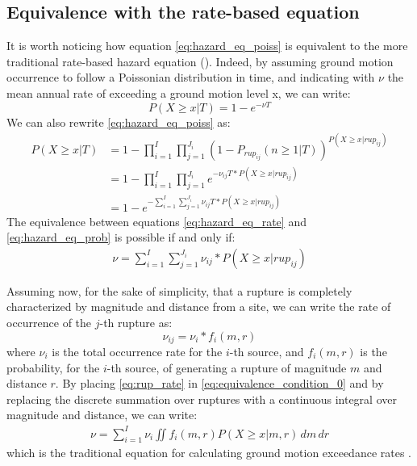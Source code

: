 \subsection{Equivalence with the rate-based equation}
It is worth noticing how equation \ref{eq:hazard_eq_poiss} is equivalent to the more traditional rate-based
hazard equation (\cite{mcguire1995}). Indeed, by assuming ground motion occurrence to follow a Poissonian
distribution in time, and indicating with $\nu$ the mean annual rate of exceeding a ground motion level x,
we can write:
\begin{equation}
\label{eq:hazard_eq_rate}
P(X \ge x | T) = 1 - e ^ {- \nu T}
\end{equation}
We can also rewrite \ref{eq:hazard_eq_poiss} as:
\begin{align}
\label{eq:hazard_eq_prob}
P(X \ge x | T) &= 1 - \prod_{i=1}^{I} \prod_{j=1}^{J_{i}} (1 - P_{rup_{ij}}(n \ge 1 | T))^{P(X \ge x | rup_{ij})} \nonumber \\
		      &= 1 - \prod_{i=1}^{I} \prod_{j=1}^{J_{i}} e^{-\nu_{ij} T * P(X \ge x | rup_{ij})} \nonumber \\
		      & = 1 - e ^ {- \sum_{i=1}^{I} \sum_{j=1}^{J_{i}} \nu_{ij} T * P(X \ge x | rup_{ij})}
\end{align}
The equivalence between equations \ref{eq:hazard_eq_rate} and \ref{eq:hazard_eq_prob} is possible if and only if:
\begin{align}
\label{eq:equivalence_condition_0}
\nu  =  \sum_{i=1}^{I} \sum_{j=1}^{J_{i}} \nu_{ij} * P(X \ge x | rup_{ij})
\end{align}

Assuming now, for the sake of simplicity, that a rupture is completely characterized by magnitude and distance from a site, we
can write the rate of occurrence of the $j$-th rupture as:
\begin{equation}
\label{eq:rup_rate}
\nu_{ij} = \nu_{i} * f_{i}(m, r)
\end{equation}
where $\nu_{i}$ is the total occurrence rate for the $i$-th source, and
$f_{i}(m, r)$ is the probability, for the $i$-th source, of generating a rupture
of magnitude $m$ and distance $r$. By placing \ref{eq:rup_rate} in
\ref{eq:equivalence_condition_0} and by replacing the discrete summation over
ruptures with a continuous integral over magnitude and distance, we can write:
\begin{align}
\nu = \sum_{i=1}^{I} \nu_{i} \iint f_{i}(m, r) P(X \ge x | m, r)\,dm \,dr
\end{align}
which is the traditional equation for calculating ground motion exceedance rates
\citep{mcguire1995}.
%
